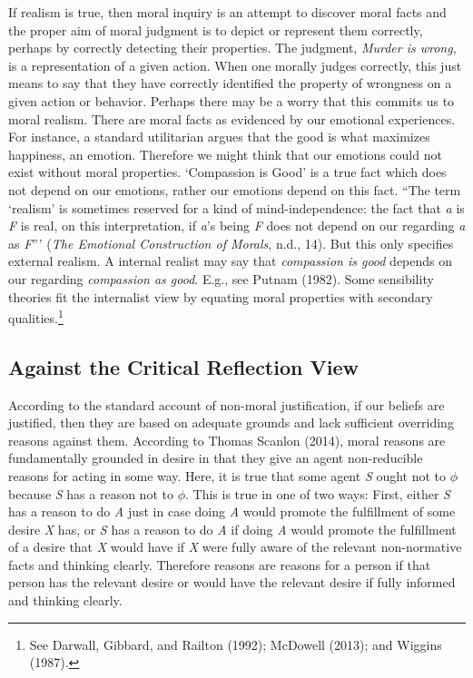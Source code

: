 \documentclass[12pt]{book}
\theoremstyle{definition}
\theoremstyle{remark}
\begin{document}
If realism is true, then moral inquiry is an attempt to discover moral facts and the proper aim of moral judgment is to depict or represent them correctly, perhaps by correctly detecting their properties. The judgment, \emph{Murder is wrong}, is a representation of a given action. When one morally judges correctly, this just means to say that they have correctly identified the property of wrongness on a given action or behavior. Perhaps there may be a worry that this commits us to moral realism. There are moral facts as evidenced by our emotional experiences. For instance, a standard utilitarian argues that the good is what maximizes happiness, an emotion. Therefore we might think that our emotions could not exist without moral properties. `Compassion is Good' is a true fact which does not depend on our emotions, rather our emotions depend on this fact. ``The term `realism' is sometimes reserved for a kind of mind-independence: the fact that \emph{a} is \emph{F} is real, on this interpretation, if \emph{a}'s being \emph{F} does not depend on our regarding \emph{a} as \emph{F}''' (\emph{The {Emotional Construction} of {Morals}}, n.d., 14). But this only specifies external realism. A internal realist may say that \emph{compassion is good} depends on our regarding \emph{compassion as good}. E.g., see Putnam (1982). Some sensibility theories fit the internalist view by equating moral properties with secondary qualities.\footnote{See Darwall, Gibbard, and Railton (1992); McDowell (2013); and Wiggins (1987).}

\subsection*{Against the Critical Reflection View}\label{against-the-critical-reflection-view}

According to the standard account of non-moral justification, if our beliefs are justified, then they are based on adequate grounds and lack sufficient overriding reasons against them. According to Thomas Scanlon (2014), moral reasons are fundamentally grounded in desire in that they give an agent non-reducible reasons for acting in some way. Here, it is true that some agent \emph{S} ought not to \(\phi\) because \emph{S} has a reason not to \(\phi\). This is true in one of two ways: First, either \emph{S} has a reason to do \emph{A} just in case doing \emph{A} would promote the fulfillment of some desire \emph{X} has, or \emph{S} has a reason to do \emph{A} if doing \emph{A} would promote the fulfillment of a desire that \emph{X} would have if \emph{X} were fully aware of the relevant non-normative facts and thinking clearly. Therefore reasons are reasons for a person if that person has the relevant desire or would have the relevant desire if fully informed and thinking clearly.
\end{document}

